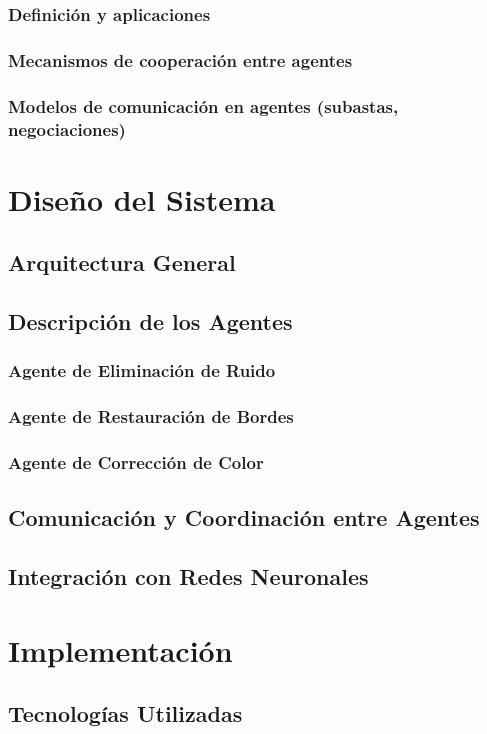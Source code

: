 \documentclass{article}
\begin{document}
\subsubsection{Definición y aplicaciones}
\subsubsection{Mecanismos de cooperación entre agentes}
\subsubsection{Modelos de comunicación en agentes (subastas, negociaciones)}

\section{Diseño del Sistema}
\subsection{Arquitectura General}
\subsection{Descripción de los Agentes}
\subsubsection{Agente de Eliminación de Ruido}
\subsubsection{Agente de Restauración de Bordes}
\subsubsection{Agente de Corrección de Color}
\subsection{Comunicación y Coordinación entre Agentes}
\subsection{Integración con Redes Neuronales}

\section{Implementación}
\subsection{Tecnologías Utilizadas}
\end{document}
